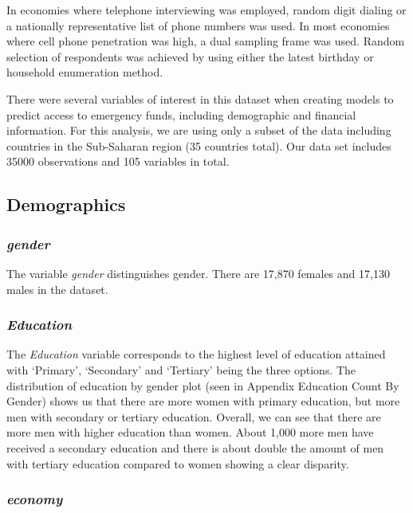 \documentclass[water,article,submit,moreauthors,pdftex]{mdpi}
\begin{document}
In economies where telephone interviewing was employed, random digit
dialing or a nationally representative list of phone numbers was used.
In most economies where cell phone penetration was high, a dual sampling
frame was used. Random selection of respondents was achieved by using
either the latest birthday or household enumeration method.

There were several variables of interest in this dataset when creating
models to predict access to emergency funds, including demographic and
financial information. For this analysis, we are using only a subset of
the data including countries in the Sub-Saharan region (35 countries
total). Our data set includes 35000 observations and 105 variables in
total.

\hypertarget{demographics}{%
\subsection{Demographics}\label{demographics}}

\hypertarget{gender}{%
\subsubsection{\texorpdfstring{\emph{gender}}{gender}}\label{gender}}

The variable \emph{gender} distinguishes gender. There are 17,870
females and 17,130 males in the dataset.

\hypertarget{education}{%
\subsubsection{\texorpdfstring{\emph{Education}}{Education}}\label{education}}

The \emph{Education} variable corresponds to the highest level of
education attained with `Primary', `Secondary' and `Tertiary' being the
three options. The distribution of education by gender plot (seen in
Appendix Education Count By Gender) shows us that there are more women
with primary education, but more men with secondary or tertiary
education. Overall, we can see that there are more men with higher
education than women. About 1,000 more men have received a secondary
education and there is about double the amount of men with tertiary
education compared to women showing a clear disparity.

\hypertarget{economy}{%
\subsubsection{\texorpdfstring{\emph{economy}}{economy}}\label{economy}}
\end{document}
